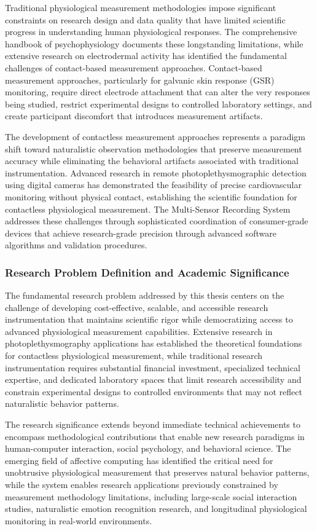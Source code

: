 \documentclass[12pt,a4paper]{report}
\begin{document}
Traditional physiological measurement methodologies impose significant constraints on research design and data quality
that have limited scientific progress in understanding human physiological responses. The comprehensive handbook of
psychophysiology documents these longstanding limitations, while extensive research on electrodermal activity has
identified the fundamental challenges of contact-based measurement approaches. Contact-based measurement approaches,
particularly for galvanic skin response (GSR) monitoring, require direct electrode attachment that can alter the very
responses being studied, restrict experimental designs to controlled laboratory settings, and create participant
discomfort that introduces measurement artifacts.

The development of contactless measurement approaches represents a paradigm shift toward naturalistic observation
methodologies that preserve measurement accuracy while eliminating the behavioral artifacts associated with traditional
instrumentation. Advanced research in remote photoplethysmographic detection using digital cameras has demonstrated the
feasibility of precise cardiovascular monitoring without physical contact, establishing the scientific foundation for
contactless physiological measurement. The Multi-Sensor Recording System addresses these challenges through
sophisticated coordination of consumer-grade devices that achieve research-grade precision through advanced software
algorithms and validation procedures.

\subsubsection{Research Problem Definition and Academic Significance}

The fundamental research problem addressed by this thesis centers on the challenge of developing cost-effective,
scalable, and accessible research instrumentation that maintains scientific rigor while democratizing access to advanced
physiological measurement capabilities. Extensive research in photoplethysmography applications has established the
theoretical foundations for contactless physiological measurement, while traditional research instrumentation requires
substantial financial investment, specialized technical expertise, and dedicated laboratory spaces that limit research
accessibility and constrain experimental designs to controlled environments that may not reflect naturalistic behavior
patterns.

The research significance extends beyond immediate technical achievements to encompass methodological contributions that
enable new research paradigms in human-computer interaction, social psychology, and behavioral science. The emerging
field of affective computing has identified the critical need for unobtrusive physiological measurement that preserves
natural behavior patterns, while the system enables research applications previously constrained by measurement
methodology limitations, including large-scale social interaction studies, naturalistic emotion recognition research,
and longitudinal physiological monitoring in real-world environments.
\end{document}
